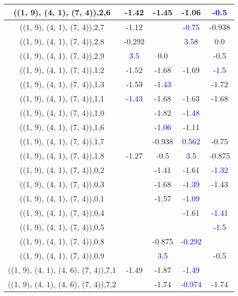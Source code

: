 \documentclass{article}
\begin{document}
\begin{center}
\begin{longtable}{|c|c|c|c|c|}
        	\hline
        	((1, 9), (4, 1), (7, 4)),2,6&-1.42&-1.45&-1.06& \textcolor{blue}{-0.5}\\
        	\hline
        	((1, 9), (4, 1), (7, 4)),2,7&-1.12&& \textcolor{blue}{-0.75}&-0.938\\
        	\hline
        	((1, 9), (4, 1), (7, 4)),2,8&-0.292&& \textcolor{blue}{3.58}&0.0\\
        	\hline
        	((1, 9), (4, 1), (7, 4)),2,9& \textcolor{blue}{3.5}&0.0&&-0.5\\
        	\hline
        	((1, 9), (4, 1), (7, 4)),1,2&-1.52&-1.68&-1.69& \textcolor{blue}{-1.5}\\
        	\hline
        	((1, 9), (4, 1), (7, 4)),1,3&-1.53& \textcolor{blue}{-1.43}&&-1.72\\
        	\hline
        	((1, 9), (4, 1), (7, 4)),1,1& \textcolor{blue}{-1.43}&-1.68&-1.63&-1.68\\
        	\hline
        	((1, 9), (4, 1), (7, 4)),1,0&&-1.82& \textcolor{blue}{-1.48}&\\
        	\hline
        	((1, 9), (4, 1), (7, 4)),1,6&& \textcolor{blue}{-1.06}&-1.11&\\
        	\hline
        	((1, 9), (4, 1), (7, 4)),1,7&&-0.938& \textcolor{blue}{0.562}&-0.75\\
        	\hline
        	((1, 9), (4, 1), (7, 4)),1,8&-1.27&-0.5& \textcolor{blue}{3.5}&-0.875\\
        	\hline
        	((1, 9), (4, 1), (7, 4)),0,2&&-1.41&-1.61& \textcolor{blue}{-1.32}\\
        	\hline
        	((1, 9), (4, 1), (7, 4)),0,3&&-1.68& \textcolor{blue}{-1.39}&-1.43\\
        	\hline
        	((1, 9), (4, 1), (7, 4)),0,1&&-1.57& \textcolor{blue}{-1.09}&\\
        	\hline
        	((1, 9), (4, 1), (7, 4)),0,4&&&-1.61& \textcolor{blue}{-1.41}\\
        	\hline
        	((1, 9), (4, 1), (7, 4)),0,5&&&& \textcolor{blue}{-1.5}\\
        	\hline
        	((1, 9), (4, 1), (7, 4)),0,8&&-0.875& \textcolor{blue}{-0.292}&\\
        	\hline
        	((1, 9), (4, 1), (7, 4)),0,9&& \textcolor{blue}{3.5}&&-0.5\\
        	\hline
        	((1, 9), (4, 1), (4, 6), (7, 4)),7,1&-1.49&-1.87& \textcolor{blue}{-1.49}&\\
        	\hline
        	((1, 9), (4, 1), (4, 6), (7, 4)),7,2&&-1.74& \textcolor{blue}{-0.974}&-1.74\\

\end{longtable}
\end{center}
\end{document}
